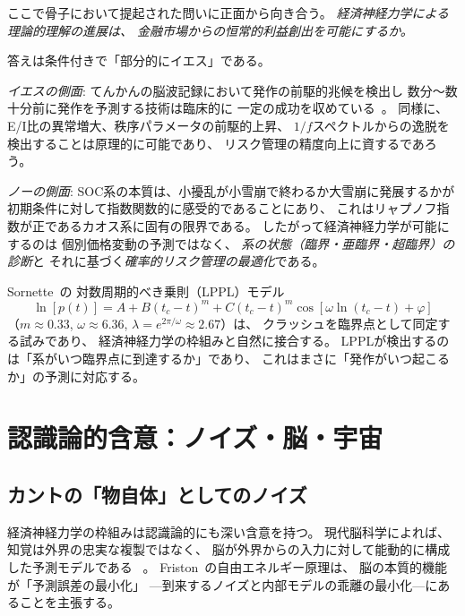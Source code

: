 \documentclass[12pt,twocolumn]{ltjsarticle}
\begin{document}
ここで骨子において提起された問いに正面から向き合う。
\emph{経済神経力学による理論的理解の進展は、
金融市場からの恒常的利益創出を可能にするか。}

答えは条件付きで「部分的にイエス」である。

\emph{イエスの側面}:
てんかんの脳波記録において発作の前駆的兆候を検出し
数分〜数十分前に発作を予測する技術は臨床的に
一定の成功を収めている~\cite{Mormann2007}。
同様に、E/I比の異常増大、秩序パラメータの前駆的上昇、
$1/f$スペクトルからの逸脱を検出することは原理的に可能であり、
リスク管理の精度向上に資するであろう。

\emph{ノーの側面}:
SOC系の本質は、小擾乱が小雪崩で終わるか大雪崩に発展するかが
初期条件に対して指数関数的に感受的であることにあり、
これはリャプノフ指数が正であるカオス系に固有の限界である。
したがって経済神経力学が可能にするのは
個別価格変動の予測ではなく、
\emph{系の状態（臨界・亜臨界・超臨界）の診断}と
それに基づく\emph{確率的リスク管理の最適化}である。

Sornette~\cite{Sornette2003}の
対数周期的べき乗則（LPPL）モデル
\begin{equation}
\ln[p(t)] = A + B(t_c - t)^m + C(t_c - t)^m
\cos[\omega\ln(t_c - t) + \varphi]
\end{equation}
（$m \approx 0.33$, $\omega \approx 6.36$,
$\lambda = e^{2\pi/\omega} \approx 2.67$）は、
クラッシュを臨界点として同定する試みであり、
経済神経力学の枠組みと自然に接合する。
LPPLが検出するのは「系がいつ臨界点に到達するか」であり、
これはまさに「発作がいつ起こるか」の予測に対応する。


\section{認識論的含意：ノイズ・脳・宇宙}
\label{sec:philosophy}

\subsection{カントの「物自体」としてのノイズ}

経済神経力学の枠組みは認識論的にも深い含意を持つ。
現代脳科学によれば、知覚は外界の忠実な複製ではなく、
脳が外界からの入力に対して能動的に構成した予測モデルである
~\cite{Clark2013}。
Friston~\cite{Friston2010}の自由エネルギー原理は、
脳の本質的機能が「予測誤差の最小化」
---到来するノイズと内部モデルの乖離の最小化---にあることを主張する。
\end{document}
